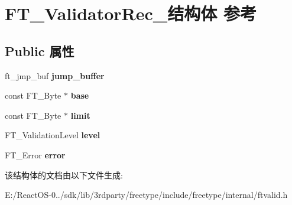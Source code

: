 \hypertarget{struct_f_t___validator_rec__}{}\section{F\+T\+\_\+\+Validator\+Rec\+\_\+结构体 参考}
\label{struct_f_t___validator_rec__}
\subsection*{Public 属性}
\begin{DoxyCompactItemize}
\item 
\mbox{\label{struct_f_t___validator_rec___aa0b346f9ef78939e93c85389aa2b54b3}} 
ft\+\_\+jmp\+\_\+buf {\bfseries jump\+\_\+buffer}
\item 
\mbox{\label{struct_f_t___validator_rec___a62de459b75acae3e1695b3d6600ca22f}} 
const F\+T\+\_\+\+Byte $\ast$ {\bfseries base}
\item 
\mbox{\label{struct_f_t___validator_rec___acc4d58a3e46d2b7c92bb51c3ddd8d331}} 
const F\+T\+\_\+\+Byte $\ast$ {\bfseries limit}
\item 
\mbox{\label{struct_f_t___validator_rec___aa70830280c76507b8b06e616da8cb545}} 
F\+T\+\_\+\+Validation\+Level {\bfseries level}
\item 
\mbox{\label{struct_f_t___validator_rec___ab12d54f54a55a90ce19761a1c24e28f0}} 
F\+T\+\_\+\+Error {\bfseries error}
\end{DoxyCompactItemize}


该结构体的文档由以下文件生成\+:\begin{DoxyCompactItemize}
\item 
E\+:/\+React\+O\+S-\/0../sdk/lib/3rdparty/freetype/include/freetype/internal/ftvalid.\+h\end{DoxyCompactItemize}
